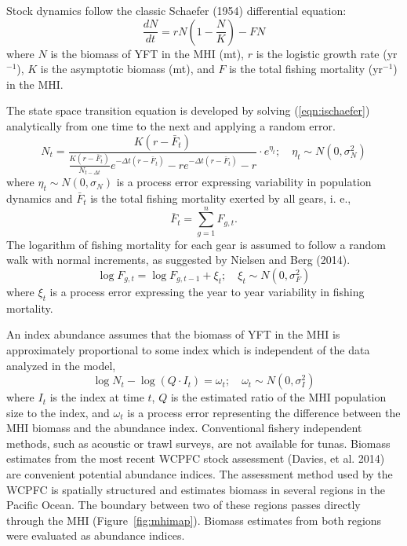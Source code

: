 \documentclass[12pt,letterpaper]{article}
\newcommand\peryr{yr$^{-1}$}
\begin{document}
Stock dynamics follow the classic Schaefer (1954) differential equation:
\begin{equation}
\label{eqn:ischaefer}
\frac{dN}{dt} = rN(1-\frac{N}{K}) - FN
\end{equation}
where $N$ is the biomass of YFT in the MHI (mt), 
$r$ is the logistic growth rate (\peryr),
$K$ is the asymptotic biomass (mt), and
$F$ is the total fishing mortality (\peryr) in the MHI.

The state space transition equation is developed by solving
(\ref{eqn:ischaefer}) analytically from one time to the next and
applying a random error.
\begin{equation}
\label{eqn:intschaeferA}
N_t = \frac{K(r-\bar{F}_t)}{\frac{K(r-\bar{F}_t)}{N_{t-\Delta t}}e^{-\Delta
t(r-\bar{F}_t)}-re^{-\Delta t(r-\bar{F}_t)} -r} \cdot e^{\eta_t};
\quad \eta_t\sim N(0,\sigma^2_N)
\end{equation}
where $\eta_t \sim N(0,\sigma_N)$ is a process error expressing
variability in population dynamics
and $\bar{F}_t$ is the total fishing mortality exerted by all gears, i. e.,
$$
\bar{F}_t =\sum_{g=1}^n F_{g,t}.
$$
The logarithm of fishing mortality for each gear is assumed to
follow a random walk with normal increments, as suggested by Nielsen
and Berg (2014).
\begin{equation}
\label{eqn:Fwalk}
\log F_{g,t} = \log F_{g,t-1} + \xi_t;\quad \xi_t\sim
N(0,\sigma^2_F)
\end{equation}
where  $\xi_t$ is a process error expressing the year to year
variability in fishing mortality.

An index abundance assumes that the biomass of YFT in the MHI
is approximately proportional to some index which is independent of
the data analyzed in the model,
\begin{equation}
\log N_t - \log (Q\cdot I_t) = \omega_t;\quad \omega_t\sim N(0,\sigma^2_I)
\label{eqn:index}
\end{equation}
where
$I_t$ is the index at time $t$,
$Q$ is the estimated ratio of the MHI population size to the index,
and $\omega_t$ is a process error representing the difference
between the MHI biomass and the abundance index. 
Conventional fishery independent methods, such as acoustic or trawl
surveys, are not available for tunas. 
Biomass estimates from the most recent WCPFC stock
assessment (Davies, et al. 2014) are convenient potential abundance
indices. The assessment method used by the
WCPFC is spatially structured and estimates biomass in several regions
in the Pacific Ocean. The boundary between two of these
regions passes directly through the MHI (Figure~\ref{fig:mhimap}).
Biomass estimates from both regions were evaluated as abundance indices.
\end{document}
